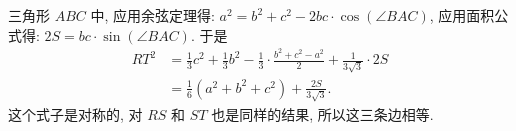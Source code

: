 三角形 $ ABC $ 中, 应用余弦定理得: $ a^2 = b^2 + c^2 - 2bc\cdot\cos(\angle BAC) $, 应用面积公式得: $ 2S = bc\cdot\sin(\angle BAC) $. 于是
\begin{align*} 
RT^2 &= \frac{1}{3}c^2 + \frac{1}{3}b^2 - \frac{1}{3}\cdot\frac{b^2+c^2-a^2}{2} + \frac{1}{3\sqrt{3}}\cdot 2S\\
	&= \frac{1}{6}(a^2+b^2+c^2)+\frac{2S}{3\sqrt{3}}.
\end{align*}
这个式子是对称的, 对 $ RS $ 和 $ ST $ 也是同样的结果, 所以这三条边相等.









































